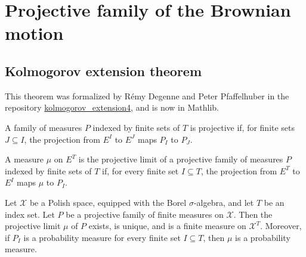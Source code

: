 \chapter{Projective family of the Brownian motion}
\label{chap:projective_family}


\section{Kolmogorov extension theorem}

This theorem was formalized by Rémy Degenne and Peter Pfaffelhuber in the repository \href{https://github.com/RemyDegenne/kolmogorov_extension4}{kolmogorov\_extension4}, and is now in Mathlib.

\begin{definition}\label{def:IsProjectiveMeasureFamily}
  \mathlibok
A family of measures $P$ indexed by finite sets of $T$ is projective if, for finite sets $J \subseteq I$, the projection from $E^I$ to $E^J$ maps $P_I$ to $P_J$.
\end{definition}


\begin{definition}\label{def:IsProjectiveLimit}
  \mathlibok
A measure $\mu$ on $E^T$ is the projective limit of a projective family of measures $P$ indexed by finite sets of $T$ if, for every finite set $I \subseteq T$, the projection from $E^T$ to $E^I$ maps $\mu$ to $P_I$.
\end{definition}


\begin{theorem}\label{thm:kolmogorovExtension}
  \mathlibok
Let $\mathcal{X}$ be a Polish space, equipped with the Borel $\sigma$-algebra, and let $T$ be an index set.
Let $P$ be a projective family of finite measures on $\mathcal{X}$.
Then the projective limit $\mu$ of $P$ exists, is unique, and is a finite measure on $\mathcal{X}^T$.
Moreover, if $P_I$ is a probability measure for every finite set $I \subseteq T$, then $\mu$ is a probability measure.
\end{theorem}


